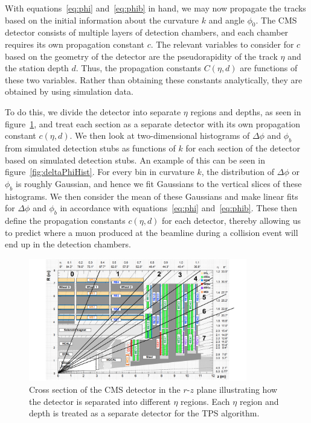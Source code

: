 With equations~\ref{eq:phi} and~\ref{eq:phib} in hand, we may now propagate the tracks based on the initial information about the curvature $k$ and angle $\phi_0$.
The CMS detector consists of multiple layers of detection chambers, and each chamber requires its own propagation constant $c$.
The relevant variables to consider for $c$ based on the geometry of the detector are the pseudorapidity of the track $\eta$ and the station depth $d$.
Thus, the propagation constants $C(\eta,d)$ are functions of these two variables.
Rather than obtaining these constants analytically, they are obtained by using simulation data. %

To do this, we divide the detector into separate $\eta$ regions and depths, as seen in figure~\ref{fig:barrelEta}, and treat each section as a separate detector with its own propagation constant $c(\eta,d)$.
We then look at two-dimensional histograms of $\Delta\phi$ and $\phi_b$ from simulated detection stubs as functions of $k$ for each section of the detector based on simulated detection stubs.
An example of this can be seen in figure~\ref{fig:deltaPhiHist}.
For every bin in curvature $k$, the distribution of $\Delta\phi$ or $\phi_b$ is roughly Gaussian, and hence we fit Gaussians to the vertical slices of these histograms.
We then consider the mean of these Gaussians and make linear fits for $\Delta\phi$ and $\phi_b$ in accordance with equations~\ref{eq:phi} and~\ref{eq:phib}.
These then define the propagation constants $c(\eta,d)$ for each detector, thereby allowing us to predict where a muon produced at the beamline during a collision event will end up in the detection chambers.

\begin{figure}[htbp]
  \centering
  \includegraphics[width=0.85\textwidth]{fig/TPS/barrelEta.pdf}
  \caption{
    Cross section of the CMS detector in the $r$-$z$ plane illustrating how the detector is separated into different $\eta$ regions.
    Each $\eta$ region and depth is treated as a separate detector for the TPS algorithm.
  }
  \label{fig:barrelEta}
\end{figure}

